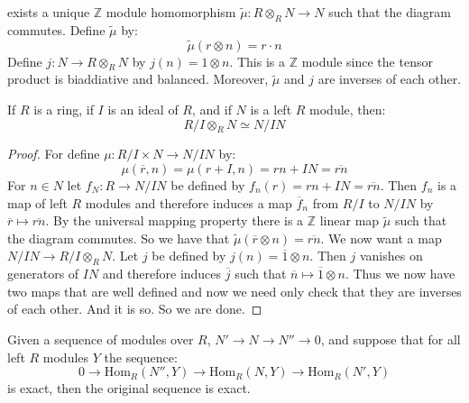     exists a unique $\mathbb{Z}$ module homomorphism
    $\tilde{\mu}:R\otimes_{R}N\rightarrow{N}$ such that the diagram
    commutes. Define $\tilde{\mu}$ by:
    \begin{equation}
        \tilde{\mu}(r\otimes{n})=r\cdot{n}
    \end{equation}
    Define $j:N\rightarrow{R}\otimes_{R}N$ by $j(n)=1\otimes{n}$.
    This is a $\mathbb{Z}$ module since the tensor product is biaddiative
    and balanced. Moreover, $\tilde{\mu}$ and $j$ are inverses of each
    other.
    \begin{theorem}
        If $R$ is a ring, if $I$ is an ideal of $R$, and if $N$ is a left
        $R$ module, then:
        \begin{equation}
            R/I\otimes_{R}N\simeq{N}/IN
        \end{equation}
    \end{theorem}
    \begin{proof}
        For define $\mu:R/I\times{N}\rightarrow{N}/IN$ by:
        \begin{equation}
            \mu(\overline{r},n)=\mu(r+I,n)=rn+IN=\overline{rn}
        \end{equation}
        For $n\in{N}$ let $f_{N}:R\rightarrow{N}/IN$ be defined by
        $f_{n}(r)=rn+IN=\overline{rn}$. Then $f_{n}$ is a map of left
        $R$ modules and therefore induces a map $\overline{f}_{n}$ from
        $R/I$ to $N/IN$ by $\overline{r}\mapsto\overline{rn}$. By the
        universal mapping property there is a $\mathbb{Z}$ linear map
        $\tilde{\mu}$ such that the diagram commutes. So we have that
        $\tilde{\mu}(\overline{r}\otimes{n})=\overline{rn}$. We now want a
        map $N/IN\rightarrow{R}/I\otimes_{R}N$. Let $j$ be defined by
        $j(n)=\overline{1}\otimes{n}$. Then $j$ vanishes on generators of
        $IN$ and therefore induces $\overline{j}$ such that
        $\overline{n}\mapsto\overline{1}\otimes{n}$. Thus we now have two
        maps that are well defined and now we need only check that they are
        inverses of each other. And it is so. So we are done.
    \end{proof}
    \begin{theorem}
        Given a sequence of modules over $R$,
        $N'\rightarrow{N}\rightarrow{N}''\rightarrow{0}$,
        and suppose that for all left $R$ modules $Y$ the
        sequence:
        \begin{equation}
            0\rightarrow\textrm{Hom}_{R}(N'',Y)
            \rightarrow\textrm{Hom}_{R}(N,Y)
            \rightarrow\textrm{Hom}_{R}(N',Y)
        \end{equation}
        is exact, then the original sequence is exact.
    \end{theorem}
